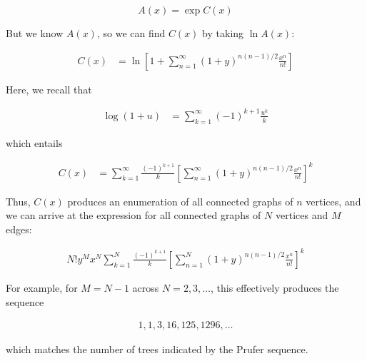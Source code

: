 \documentclass[a4paper, 12pt]{article}
\begin{document}
\begin{equation*}
    A(x) = \exp C(x)
\end{equation*}

But we know $A(x)$, so we can find $C(x)$ by taking $\ln A(x)$:

\begin{align*}
    C(x) &= \ln \left[1 + \sum_{n=1}^{\infty} (1+y)^{n(n-1)/2} \frac{x^n}{n!}\right]
\end{align*}

Here, we recall that 

\begin{align*}
    \log (1 + u) &= \sum_{k=1}^{\infty} (-1)^{k+1} \frac{u^k}{k}
\end{align*}

which entails 

\begin{align*}
    C(x) &= \sum_{k=1}^{\infty} \frac{ (-1)^{k+1} }{k} \left[ \sum_{n=1}^{\infty}\left( 1+y \right)^{n (n-1) / 2} \frac{x^n}{n!}  \right]^{k} 
\end{align*}

Thus, $C(x)$ produces an enumeration of all connected graphs of $n$ vertices, and we can arrive at the expression for all connected graphs of $N$ vertices and $M$ edges:

\begin{align*}
    N! y^M x^N \sum_{k=1}^{N} \frac{ (-1)^{k+1} }{k} \left[ \sum_{n=1}^{N}\left( 1+y \right)^{n (n-1) / 2} \frac{x^n}{n!}  \right]^{k} 
\end{align*}

For example, for $M = N - 1$ across $N = 2, 3, \ldots$, this effectively produces the sequence 

\begin{align*}
    1, 1, 3, 16, 125, 1296, \ldots
\end{align*}

which matches the number of trees indicated by the Prufer sequence.
\end{document}
